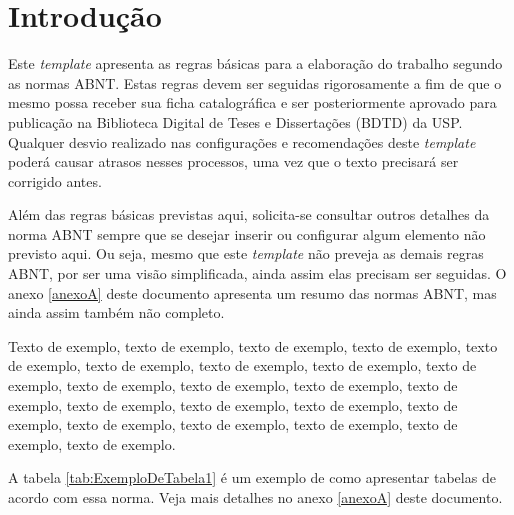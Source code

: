 \documentclass[
	12pt,				%
	oneside,			%
	a4paper,			%
	english,			%
	brazil				%
	]{abntex2ppgsi}
\begin{document}
\tableofcontents*
\cleardoublepage



\textual



% 
%
%
\chapter{Introdução}
Este \textit{template} apresenta as regras básicas para a elaboração do trabalho segundo as normas ABNT. Estas regras devem ser seguidas rigorosamente a fim de que o mesmo possa receber sua ficha catalográfica e ser posteriormente aprovado para publicação na Biblioteca Digital de Teses e Dissertações (BDTD) da USP. Qualquer desvio realizado nas configurações e recomendações deste \textit{template} poderá causar atrasos nesses processos, uma vez que o texto precisará ser corrigido antes. 

Além das regras básicas previstas aqui, solicita-se consultar outros detalhes da norma ABNT sempre que se desejar inserir ou configurar algum elemento não previsto aqui. Ou seja, mesmo que este \textit{template} não preveja as demais regras ABNT, por ser uma visão simplificada, ainda assim elas precisam ser seguidas. O anexo \ref{anexoA} deste documento apresenta um resumo das normas ABNT, mas ainda assim também não completo.

Texto de exemplo, texto de exemplo, texto de exemplo, texto de exemplo, texto de exemplo, texto de exemplo, texto de exemplo, texto de exemplo, texto de exemplo, texto de exemplo, texto de exemplo, texto de exemplo, texto de exemplo, texto de exemplo, texto de exemplo, texto de exemplo, texto de exemplo, texto de exemplo, texto de exemplo, texto de exemplo, texto de exemplo, texto de exemplo.  

A tabela \ref{tab:ExemploDeTabela1} é um exemplo de como apresentar tabelas de acordo com essa norma. Veja mais detalhes no anexo \ref{anexoA} deste documento.
\end{document}
